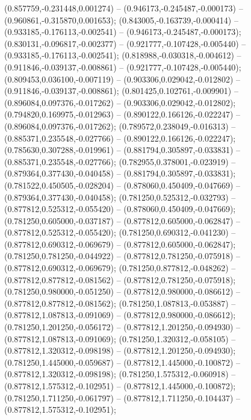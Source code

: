 (0.857759,-0.231448,0.001274) -- (0.946173,-0.245487,-0.000173) -- (0.960861,-0.315870,0.001653);
 (0.843005,-0.163739,-0.000414) -- (0.933185,-0.176113,-0.002541) -- (0.946173,-0.245487,-0.000173);
 (0.830131,-0.096817,-0.002377) -- (0.921777,-0.107428,-0.005440) -- (0.933185,-0.176113,-0.002541);
 (0.818988,-0.030318,-0.004612) -- (0.911846,-0.039137,-0.008861) -- (0.921777,-0.107428,-0.005440);
 (0.809453,0.036100,-0.007119) -- (0.903306,0.029042,-0.012802) -- (0.911846,-0.039137,-0.008861);
 (0.801425,0.102761,-0.009901) -- (0.896084,0.097376,-0.017262) -- (0.903306,0.029042,-0.012802);
 (0.794820,0.169975,-0.012963) -- (0.890122,0.166126,-0.022247) -- (0.896084,0.097376,-0.017262);
 (0.789572,0.238049,-0.016313) -- (0.885371,0.235548,-0.027766) -- (0.890122,0.166126,-0.022247);
 (0.785630,0.307288,-0.019961) -- (0.881794,0.305897,-0.033831) -- (0.885371,0.235548,-0.027766);
 (0.782955,0.378001,-0.023919) -- (0.879364,0.377430,-0.040458) -- (0.881794,0.305897,-0.033831);
 (0.781522,0.450505,-0.028204) -- (0.878060,0.450409,-0.047669) -- (0.879364,0.377430,-0.040458);
 (0.781250,0.525312,-0.032793) -- (0.877812,0.525312,-0.055420) -- (0.878060,0.450409,-0.047669);
 (0.781250,0.605000,-0.037187) -- (0.877812,0.605000,-0.062847) -- (0.877812,0.525312,-0.055420);
 (0.781250,0.690312,-0.041230) -- (0.877812,0.690312,-0.069679) -- (0.877812,0.605000,-0.062847);
 (0.781250,0.781250,-0.044922) -- (0.877812,0.781250,-0.075918) -- (0.877812,0.690312,-0.069679);
 (0.781250,0.877812,-0.048262) -- (0.877812,0.877812,-0.081562) -- (0.877812,0.781250,-0.075918);
 (0.781250,0.980000,-0.051250) -- (0.877812,0.980000,-0.086612) -- (0.877812,0.877812,-0.081562);
 (0.781250,1.087813,-0.053887) -- (0.877812,1.087813,-0.091069) -- (0.877812,0.980000,-0.086612);
 (0.781250,1.201250,-0.056172) -- (0.877812,1.201250,-0.094930) -- (0.877812,1.087813,-0.091069);
 (0.781250,1.320312,-0.058105) -- (0.877812,1.320312,-0.098198) -- (0.877812,1.201250,-0.094930);
 (0.781250,1.445000,-0.059687) -- (0.877812,1.445000,-0.100872) -- (0.877812,1.320312,-0.098198);
 (0.781250,1.575312,-0.060918) -- (0.877812,1.575312,-0.102951) -- (0.877812,1.445000,-0.100872);
 (0.781250,1.711250,-0.061797) -- (0.877812,1.711250,-0.104437) -- (0.877812,1.575312,-0.102951);
